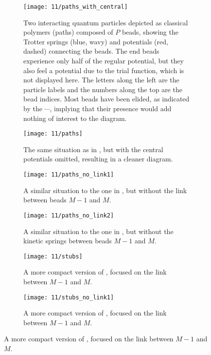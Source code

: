 \begin{figure}
	\setlength{\figspacing}{10 mm}
	\centering
	\begin{subfigure}[b]{\textwidth}
		\texttt{[image: 11/paths\_with\_central]}
		\caption{
			Two interacting quantum particles depicted as classical polymers (paths) composed of $P$ beads, showing the Trotter springs (blue, wavy) and potentials (red, dashed) connecting the beads.
			The end beads experience only half of the regular potential, but they also feel a potential due to the trial function, which is not displayed here.
			The letters along the left are the particle labels and the numbers along the top are the bead indices.
			Most beads have been elided, as indicated by the $\cdots$, implying that their presence would add nothing of interest to the diagram.
		}
		\label{fig:paths-with-central}
		\vspace{\figspacing}
	\end{subfigure}
	\begin{subfigure}[b]{\textwidth}
		\texttt{[image: 11/paths]}
		\caption{
			The same situation as in , but with the central potentials omitted, resulting in a cleaner diagram.
		}
		\label{fig:paths}
		\vspace{\figspacing}
	\end{subfigure}
	\begin{subfigure}[b]{\textwidth}
		\texttt{[image: 11/paths\_no\_link1]}
		\caption{
			A similar situation to the one in , but without the link between beads $M-1$ and $M$.
		}
		\label{fig:paths-no-link1}
		\vspace{\figspacing}
	\end{subfigure}
	\begin{subfigure}[b]{\textwidth}
		\texttt{[image: 11/paths\_no\_link2]}
		\caption{
			A similar situation to the one in , but without the kinetic springs between beads $M-1$ and $M$.
		}
		\label{fig:paths-no-link2}
		\vspace{\figspacing}
	\end{subfigure}
	\mbox{}
	\hfill
	\begin{subfigure}[b]{0.45\textwidth}
		\centering
		\texttt{[image: 11/stubs]}
		\caption{
			A more compact version of , focused on the link between $M-1$ and $M$.
		}
		\label{fig:stubs}
	\end{subfigure}
	\hfill
	\begin{subfigure}[b]{0.45\textwidth}
		\centering
		\texttt{[image: 11/stubs\_no\_link1]}
		\caption{
			A more compact version of , focused on the link between $M-1$ and $M$.
		}
		\label{fig:stubs-no-link1}
	\end{subfigure}
	\hfill
	\mbox{}
	\vspace{\figspacing}


\end{figure}
